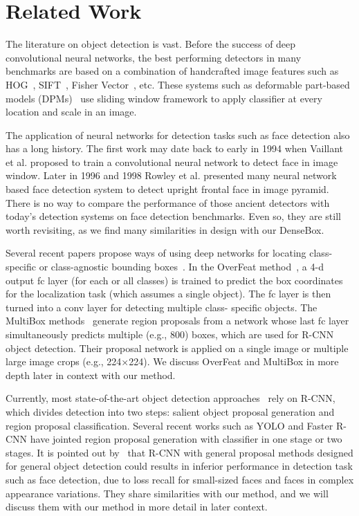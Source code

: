 \section{Related Work}

The literature on object detection is vast. Before the success of deep convolutional neural networks, the best performing detectors in many benchmarks are based on a combination of handcrafted image features such as HOG~\cite{dalal2005histograms}, SIFT~\cite{lowe2004distinctive}, Fisher Vector~\cite{cinbis2013segmentation}, etc. These systems such as deformable part-based models (DPMs)~\cite{felzenszwalb2010object, zhu2012face} use sliding window framework to apply classifier at every location and scale in an image.

The application of neural networks for detection tasks such as face detection also has a long history. The first work may date back to early in 1994 when Vaillant et al.\cite{vaillant1994original} proposed to train a convolutional neural network to detect face in image window. Later in 1996 and 1998 Rowley et al.\cite{rowley1998neural,rowley1998rotation} presented many neural network based face detection system to detect upright frontal face in image pyramid. There is no way to compare the performance of those ancient detectors with today’s detection systems on face detection benchmarks. Even so, they are still worth revisiting, as we find many similarities in design with our DenseBox. 

Several recent papers propose ways of using deep networks for locating class-specific or class-agnostic bounding boxes~\cite{sermanet2013overfeat, erhan2014scalable, YOLO}. In the OverFeat method~\cite{sermanet2013overfeat}, a 4-d output fc layer (for each or all classes) is trained to predict the box coordinates for the localization task (which assumes a single object). The fc layer is then turned into a conv layer for detecting multiple class- specific objects. The MultiBox methods~\cite{erhan2014scalable} generate region proposals from a network whose last fc layer simultaneously predicts multiple (e.g., 800) boxes, which are used for R-CNN~\cite{girshick2014rich} object detection. Their proposal network is applied on a single image or multiple large image crops (e.g., 224×224). We discuss OverFeat and MultiBox in more depth later in context with our method.

Currently, most state-of-the-art object detection approaches~\cite{ouyang2014deepid, li2015convolutional, erhan2014scalable,girshick2015fast} rely on R-CNN, which divides detection into two steps: salient object proposal generation and region proposal classification. Several recent works such as YOLO and Faster R-CNN have jointed region proposal generation with classifier in one stage or two stages. It is pointed out by~\cite{farfade2015multi} that R-CNN with general proposal methods designed for general object detection could results in inferior performance in detection task such as face detection, due to loss recall for small-sized faces and faces in complex appearance variations. They share similarities with our method, and we will discuss them with our method in more detail in later context.  

